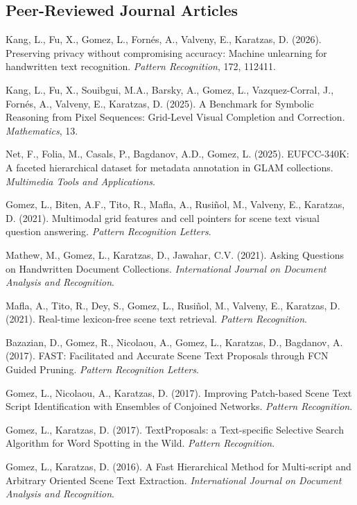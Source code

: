 \documentclass[11pt]{article}
\newcommand{\venue}[1]{\textit{#1}}
\begin{document}
\subsection*{Peer-Reviewed Journal Articles}
\begin{pubs}[start=1]
\item Kang, L., Fu, X., Gomez, L., Fornés, A., Valveny, E., Karatzas, D. (2026). Preserving privacy without compromising accuracy: Machine unlearning for handwritten text recognition. \venue{Pattern Recognition}, 172, 112411.
\item Kang, L., Fu, X., Souibgui, M.A., Barsky, A., Gomez, L., Vazquez-Corral, J., Fornés, A., Valveny, E., Karatzas, D. (2025). A Benchmark for Symbolic Reasoning from Pixel Sequences: Grid-Level Visual Completion and Correction. \venue{Mathematics}, 13.
\item Net, F., Folia, M., Casals, P., Bagdanov, A.D., Gomez, L. (2025). EUFCC-340K: A faceted hierarchical dataset for metadata annotation in GLAM collections. \venue{Multimedia Tools and Applications}.
\item Gomez, L., Biten, A.F., Tito, R., Mafla, A., Rusiñol, M., Valveny, E., Karatzas, D. (2021). Multimodal grid features and cell pointers for scene text visual question answering. \venue{Pattern Recognition Letters}.
\item Mathew, M., Gomez, L., Karatzas, D., Jawahar, C.V. (2021). Asking Questions on Handwritten Document Collections. \venue{International Journal on Document Analysis and Recognition}.
\item Mafla, A., Tito, R., Dey, S., Gomez, L., Rusiñol, M., Valveny, E., Karatzas, D. (2021). Real-time lexicon-free scene text retrieval. \venue{Pattern Recognition}.
\item Bazazian, D., Gomez, R., Nicolaou, A., Gomez, L., Karatzas, D., Bagdanov, A. (2017). FAST: Facilitated and Accurate Scene Text Proposals through FCN Guided Pruning. \venue{Pattern Recognition Letters}.
\item Gomez, L., Nicolaou, A., Karatzas, D. (2017). Improving Patch-based Scene Text Script Identification with Ensembles of Conjoined Networks. \venue{Pattern Recognition}.
\item Gomez, L., Karatzas, D. (2017). TextProposals: a Text-specific Selective Search Algorithm for Word Spotting in the Wild. \venue{Pattern Recognition}.
\item Gomez, L., Karatzas, D. (2016). A Fast Hierarchical Method for Multi-script and Arbitrary Oriented Scene Text Extraction. \venue{International Journal on Document Analysis and Recognition}.
\end{pubs}
\end{document}

